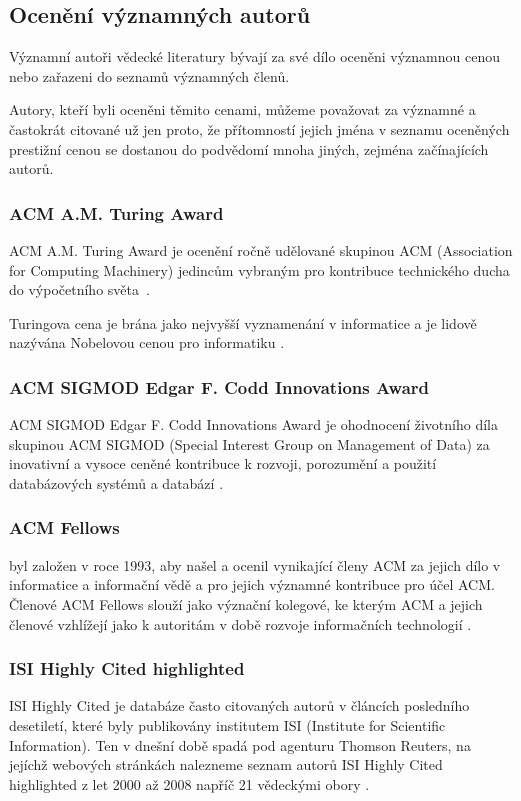 \documentclass{bakalarka}
\begin{document}
\subsection{Ocenění významných autorů}
Významní autoři vědecké literatury bývají za své dílo oceněni významnou cenou
nebo zařazeni do seznamů významných členů.

Autory, kteří byli oceněni těmito cenami, můžeme považovat za významné a
častokrát citované už jen proto, že přítomností jejich jména v seznamu
oceněných prestižní cenou se dostanou do podvědomí mnoha jiných, zejména
začínajících autorů.

\subsubsection{ACM A.M. Turing Award}
ACM A.M. Turing Award je ocenění ročně udělované skupinou ACM (Association for
Computing Machinery) jedincům vybraným pro kontribuce technického ducha do
výpočetního světa~\citep{turingaward}.

Turingova cena je brána jako nejvyšší vyznamenání v informatice a je lidově
nazývána Nobelovou cenou pro informatiku \citep{dasgupta}.

\subsubsection{ACM SIGMOD Edgar F. Codd Innovations Award}
ACM SIGMOD Edgar F. Codd Innovations Award je ohodnocení životního díla
skupinou ACM SIGMOD (Special Interest Group on Management of Data) za
inovativní a vysoce ceněné kontribuce k rozvoji, porozumění a použití
databázových systémů a databází \citep{sigmodinnovations}.

\subsubsection{ACM Fellows}
 byl založen v roce 1993, aby našel a ocenil
vynikající členy ACM za jejich dílo v informatice a informační vědě a pro
jejich významné kontribuce pro účel ACM. Členové ACM Fellows slouží jako
význační kolegové, ke kterým ACM a jejich členové vzhlížejí jako k autoritám v
době rozvoje informačních technologií \citep{acmfellows}.

\subsubsection{ISI Highly Cited highlighted}
ISI Highly Cited je databáze často citovaných autorů v článcích posledního
desetiletí, které byly publikovány institutem ISI (Institute for Scientific
Information). Ten v dnešní době spadá pod agenturu Thomson Reuters, na jejíchž
webových stránkách nalezneme seznam autorů ISI Highly Cited highlighted z let
2000 až 2008 napříč 21 vědeckými obory \citep{highlycited}.
\end{document}
